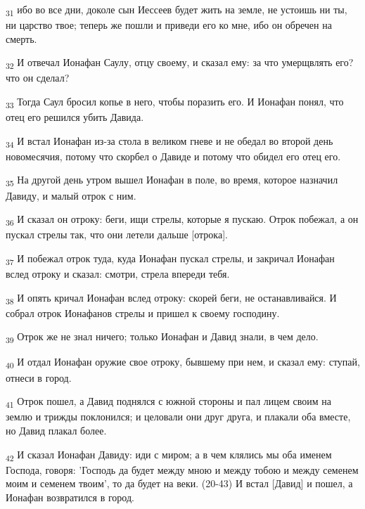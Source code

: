 \begin{tcolorbox}
\textsubscript{31} ибо во все дни, доколе сын Иессеев будет жить на земле, не устоишь ни ты, ни царство твое; теперь же пошли и приведи его ко мне, ибо он обречен на смерть.
\end{tcolorbox}
\begin{tcolorbox}
\textsubscript{32} И отвечал Ионафан Саулу, отцу своему, и сказал ему: за что умерщвлять его? что он сделал?
\end{tcolorbox}
\begin{tcolorbox}
\textsubscript{33} Тогда Саул бросил копье в него, чтобы поразить его. И Ионафан понял, что отец его решился убить Давида.
\end{tcolorbox}
\begin{tcolorbox}
\textsubscript{34} И встал Ионафан из-за стола в великом гневе и не обедал во второй день новомесячия, потому что скорбел о Давиде и потому что обидел его отец его.
\end{tcolorbox}
\begin{tcolorbox}
\textsubscript{35} На другой день утром вышел Ионафан в поле, во время, которое назначил Давиду, и малый отрок с ним.
\end{tcolorbox}
\begin{tcolorbox}
\textsubscript{36} И сказал он отроку: беги, ищи стрелы, которые я пускаю. Отрок побежал, а он пускал стрелы так, что они летели дальше [отрока].
\end{tcolorbox}
\begin{tcolorbox}
\textsubscript{37} И побежал отрок туда, куда Ионафан пускал стрелы, и закричал Ионафан вслед отроку и сказал: смотри, стрела впереди тебя.
\end{tcolorbox}
\begin{tcolorbox}
\textsubscript{38} И опять кричал Ионафан вслед отроку: скорей беги, не останавливайся. И собрал отрок Ионафанов стрелы и пришел к своему господину.
\end{tcolorbox}
\begin{tcolorbox}
\textsubscript{39} Отрок же не знал ничего; только Ионафан и Давид знали, в чем дело.
\end{tcolorbox}
\begin{tcolorbox}
\textsubscript{40} И отдал Ионафан оружие свое отроку, бывшему при нем, и сказал ему: ступай, отнеси в город.
\end{tcolorbox}
\begin{tcolorbox}
\textsubscript{41} Отрок пошел, а Давид поднялся с южной стороны и пал лицем своим на землю и трижды поклонился; и целовали они друг друга, и плакали оба вместе, но Давид плакал более.
\end{tcolorbox}
\begin{tcolorbox}
\textsubscript{42} И сказал Ионафан Давиду: иди с миром; а в чем клялись мы оба именем Господа, говоря: 'Господь да будет между мною и между тобою и между семенем моим и семенем твоим', то да будет на веки. (20-43) И встал [Давид] и пошел, а Ионафан возвратился в город.
\end{tcolorbox}
